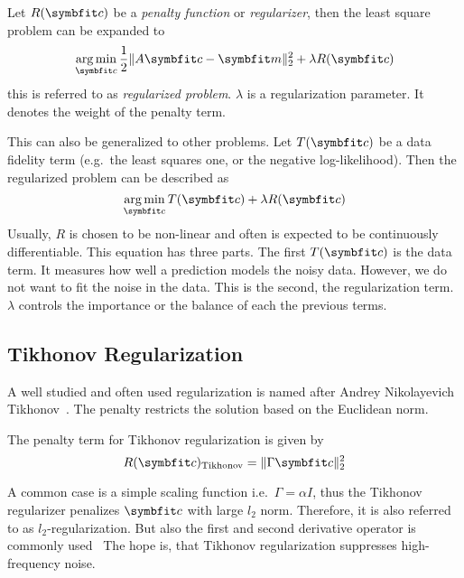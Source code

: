 \begin{definition}\label{def:regularized_problem}
	Let \(R(\mvec{c})\) be a \textit{penalty function} or \textit{regularizer}, then the least
	square problem can be expanded to
	\[
		\argmin_{\mvec{c}} \frac{1}{2} \norm{A \mvec{c} - \mvec{m}}_2^2 + \lambda R(\mvec{c})
	\]
	this is referred to as \textit{regularized problem}. \(\lambda\) is a regularization
	parameter. It denotes the weight of the penalty term.
\end{definition}

This can also be generalized to other problems. Let \(T(\mvec{c})\) be a data fidelity term (e.g.\
the least squares one, or the negative log-likelihood). Then the regularized problem can be
described as
\begin{equation}
	\argmin_{\mvec{c}} T(\mvec{c}) + \lambda R(\mvec{c})
\end{equation}
Usually, \(R\) is chosen to be non-linear and often is expected to be continuously differentiable.
This equation has three parts. The first \(T(\mvec{c})\) is the data term. It measures how well a
prediction models the noisy data. However, we do not want to fit the noise in the data. This is the
second, the regularization term. \(\lambda\) controls the importance or the balance of each the
previous terms.

\subsection{Tikhonov Regularization}\label{subsec:tikhonov_regularization}

A well studied and often used regularization is named after Andrey Nikolayevich
Tikhonov~\cite{tihonov_solution_1963}. The penalty restricts the solution based on the Euclidean
norm.

\begin{definition}\label{def:tikhonov_regularization}
	The penalty term for Tikhonov regularization is given by
	\[
		R(\mvec{c})_{\text{Tikhonov}} = \norm{\Gamma \mvec{c}}_2^2
	\]
\end{definition}
A common case is a simple scaling function i.e.\ \(\Gamma = \alpha I\), thus the Tikhonov
regularizer penalizes \(\mvec{c}\) with large \(l_2\) norm. Therefore, it is also referred to as
\(l_2\)-regularization. But also the first and second derivative operator is commonly
used~\cite{golub_tikhonov_1999} The hope is, that Tikhonov regularization suppresses high-frequency
noise.

